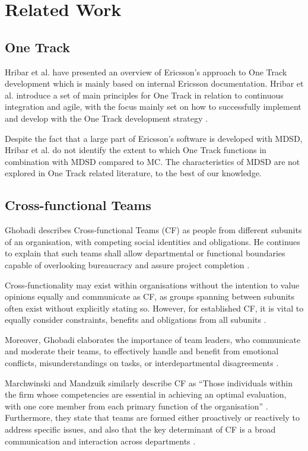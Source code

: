 \documentclass[fina_report_innit.tex]{subfiles}
\begin{document}
\section{Related Work}


\subsection{One Track}
Hribar et al. \cite{hribar2008first} have presented an overview of Ericsson's approach to One Track development which is mainly based on internal Ericsson documentation. Hribar et al. introduce a set of main principles for One Track in relation to continuous integration and agile, with the focus mainly set on how to successfully implement and develop with the One Track development strategy \cite{hribar2008first}.

Despite the fact that a large part of Ericsson's software is developed with MDSD, Hribar et al. do not identify the extent to which One Track functions in combination with MDSD compared to MC. The characteristics of MDSD are not explored in One Track related literature, to the best of our knowledge.

\subsection{Cross-functional Teams}
Ghobadi describes Cross-functional Teams (CF) as people from different subunits of an organisation, with competing social identities and obligations. He continues to explain that such teams shall allow departmental or functional boundaries capable of overlooking bureaucracy and assure project completion \cite{ghobadi2011challenges}.

Cross-functionality may exist within organisations without the intention to value opinions equally and communicate as CF, as groups spanning between subunits often exist without explicitly stating so. However, for established CF, it is vital to equally consider constraints, benefits and obligations from all subunits \cite{ghobadi2011challenges}.

Moreover, Ghobadi elaborates the importance of team leaders, who communicate and moderate their teams, to effectively handle and benefit from emotional conflicts, misunderstandings on tasks, or interdepartmental disagreements \cite{ghobadi2011challenges}.

Marchwinski and Mandzuik similarly describe CF as ``Those individuals within the firm whose competencies are essential in achieving an optimal evaluation, with one core member from each primary function of the organisation'' \cite{marchwinski2000technical}. Furthermore, they state that teams are formed either proactively or reactively to address specific issues, and also that the key determinant of CF is a broad communication and interaction across departments \cite{marchwinski2000technical}.
\end{document}
